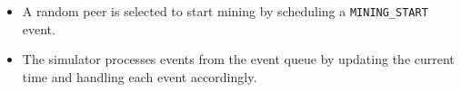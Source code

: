\documentclass[a4paper,12pt]{article}
\begin{document}
	
	

\begin{itemize}
	\item A random peer is selected to start mining by scheduling a \texttt{MINING\_START} event.
	\item The simulator processes events from the event queue by updating the current time and handling each event accordingly.
\end{itemize}

\end{document}
